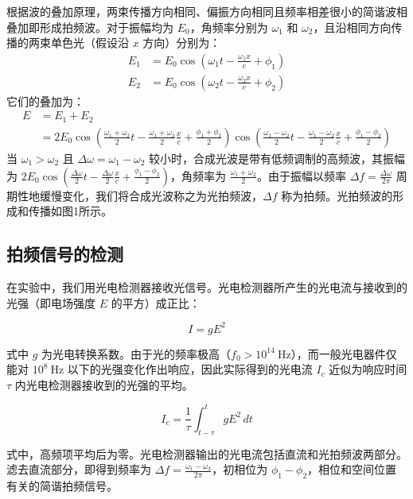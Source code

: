 \documentclass[12pt,a4paper]{article}
\newcommand{\be}[1]{
    \begin{equation}
        #1
    \end{equation}
}
\begin{document}
根据波的叠加原理，两束传播方向相同、偏振方向相同且频率相差很小的简谐波相叠加即形成拍频波。对于振幅均为 $E_0$，角频率分别为 $\omega_1$ 和 $\omega_2$，且沿相同方向传播的两束单色光（假设沿 $x$ 方向）分别为：
\begin{equation}
\begin{align}
    E_{1} & = E_{0} \cos \left(\omega_{1} t-\frac{\omega_{1} x}{c}+\phi_{1}\right)\\
    E_{2} & = E_{0} \cos \left(\omega_{2} t-\frac{\omega_{2} x}{c}+\phi_{2}\right)
    \end{align}
\end{equation}
它们的叠加为：
\begin{equation}
\begin{align}
    E & = E_{1}+E_{2}\\ & = 2 E_{0} \cos \left(\frac{\omega_{1}+\omega_{2}}{2} t-\frac{\omega_{1}+\omega_{2}}{2} \frac{x}{c}+\frac{\phi_{1}+\phi_{2}}{2}\right) \cos \left(\frac{\omega_{1}-\omega_{2}}{2} t-\frac{\omega_{1}-\omega_{2}}{2} \frac{x}{c}+\frac{\phi_{1}-\phi_{2}}{2}\right)
    \end{align}
    \end{equation}
当 $\omega_1 > \omega_2$ 且 $\Delta \omega = \omega_1 - \omega_2$ 较小时，合成光波是带有低频调制的高频波，其振幅为 $2 E_0 \cos\left( \frac{\Delta \omega}{2} t - \frac{\Delta \omega}{2} \frac{x}{c} + \frac{\phi_1 - \phi_2}{2} \right)$，角频率为 $\frac{\omega_1 + \omega_2}{2}$。由于振幅以频率 $\Delta f = \frac{\Delta \omega}{2\pi}$ 周期性地缓慢变化，我们将合成光波称之为光拍频波，$\Delta f$ 称为拍频。光拍频波的形成和传播如图1所示。

\subsection{拍频信号的检测}

在实验中，我们用光电检测器接收光信号。光电检测器所产生的光电流与接收到的光强（即电场强度 $E$ 的平方）成正比：


\be{I = gE^2}

式中 $g$ 为光电转换系数。由于光的频率极高（$f_0 > 10^{14} \ \text{Hz}$），而一般光电器件仅能对 $10^8 \ \text{Hz}$ 以下的光强变化作出响应，因此实际得到的光电流 $I_c$ 近似为响应时间 $\tau$ 内光电检测器接收到的光强的平均。


\be{I_c = \frac{1}{\tau} \int_{t-\tau}^{t} gE^2 \, dt }

式中，高频项平均后为零。光电检测器输出的光电流包括直流和光拍频波两部分。滤去直流部分，即得到频率为 $\Delta f = \frac{\omega_1 - \omega_2}{2\pi}$，初相位为 $\phi_1 - \phi_2$，相位和空间位置有关的简谐拍频信号。
\end{document}
